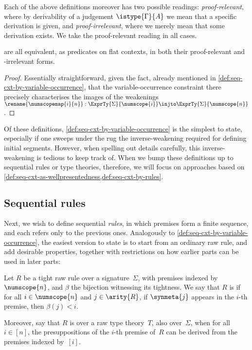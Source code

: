 Each of the above definitions moreover has two possible readings: \emph{proof-relevant}, where by derivability of a judgement $\istype{\Gamma}{A}$ we mean that a specific derivation is given, and \emph{proof-irrelevant}, where we merely mean that some derivation exists.
%
We take the proof-relevant reading in all cases.

\begin{proposition}   are all equivalent, as predicates on flat contexts, in both their proof-relevant and -irrelevant forms.
\end{proposition}

\begin{proof}
Essentially straightforward, given the fact, already mentioned in \cref{def:seq-cxt-by-variable-occurrence}, that the variable-occurrence constraint there precisely characterises the images of the weakenings $\rename{{\numscopemap{i}{n}}} : \ExprTy{\Sigma}{\numscope{i}} \injto \ExprTy{\Sigma}{\numscope{n}}$.
\end{proof}

Of these definitions, \cref{def:seq-cxt-by-variable-occurrence} is the simplest to state, especially if one sweeps under the rug the inverse-weakening required for defining initial segments.
%
However, when spelling out details carefully, this inverse-weakening is tedious to keep track of.
%
When we bump these definitions up to sequential rules or type theories, therefore, we will focus on approaches based on \cref{def:seq-cxt-as-wellpresentedness,def:seq-cxt-by-rules}.

\subsection{Sequential rules}
\label{sec:sequential-rules}


Next, we wish to define sequential \emph{rules}, in which premises form a finite sequence, and each refers only to the previous ones.
%
Analogously to \cref{def:seq-cxt-by-variable-occurrence}, the easiest version to state is to start from an ordinary raw rule, and add desirable properties, together with restrictions on how earlier parts can be used in later parts:

\begin{definition}
  Let $R$ be a tight raw rule over a signature~$\Sigma$, with premises indexed by $\numscope{n}$, and $\beta$ the bijection witnessing its tightness.
  We say that $R$ is  if for all $i \in \numscope{n}$ and $j \in \arity{R}$, if $\synmeta{j}$ appears in the $i$-th premise, then $\beta(j) < i$.

  Moreover, say that $R$ is 
  over a raw type theory~$T$, also over~$\Sigma$,
  when for all $i \in [n]$, the presuppositions of the $i$-th premise of~$R$
  can be derived from the premises indexed by~$[i]$.
\end{definition}

